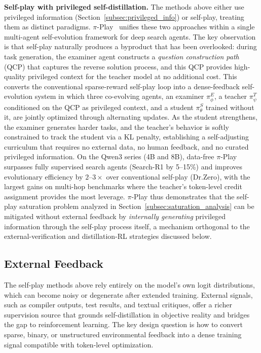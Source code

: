 \documentclass{article} %
\begin{document}
\textbf{Self-play with privileged self-distillation.}
The methods above either use privileged information (Section~\ref{subsec:privileged_info}) or self-play, treating them as distinct paradigms. $\pi$-Play~\citep{zhang2026piplay} unifies these two approaches within a single multi-agent self-evolution framework for deep search agents. The key observation is that self-play naturally produces a byproduct that has been overlooked: during task generation, the examiner agent constructs a \emph{question construction path} (QCP) that captures the reverse solution process, and this QCP provides high-quality privileged context for the teacher model at no additional cost. This converts the conventional sparse-reward self-play loop into a dense-feedback self-evolution system in which three co-evolving agents, an examiner $\pi^E_\phi$, a teacher $\pi^T_\psi$ conditioned on the QCP as privileged context, and a student $\pi^S_\theta$ trained without it, are jointly optimized through alternating updates. As the student strengthens, the examiner generates harder tasks, and the teacher's behavior is softly constrained to track the student via a KL penalty, establishing a self-adjusting curriculum that requires no external data, no human feedback, and no curated privileged information. On the Qwen3 series (4B and 8B), data-free $\pi$-Play surpasses fully supervised search agents (Search-R1 by 5--15\%) and improves evolutionary efficiency by $2$--$3\times$ over conventional self-play (Dr.Zero), with the largest gains on multi-hop benchmarks where the teacher's token-level credit assignment provides the most leverage. $\pi$-Play thus demonstrates that the self-play saturation problem analyzed in Section~\ref{subsec:saturation_analysis} can be mitigated without external feedback by \emph{internally generating} privileged information through the self-play process itself, a mechanism orthogonal to the external-verification and distillation-RL strategies discussed below.


\subsection{External Feedback}
\label{subsec:external_feedback}

The self-play methods above rely entirely on the model's own logit distributions, which can become noisy or degenerate after extended training. External signals, such as compiler outputs, test results, and textual critiques, offer a richer supervision source that grounds self-distillation in objective reality and bridges the gap to reinforcement learning. The key design question is how to convert sparse, binary, or unstructured environmental feedback into a dense training signal compatible with token-level optimization.
\end{document}
